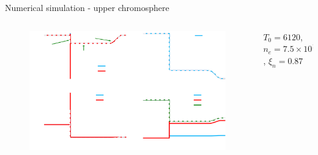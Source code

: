 \documentclass[10pt,aspectratio=169,usenames,dvipsnames]{beamer}
\begin{document}
\begin{frame}{Numerical simulation - upper chromosphere}
\begin{columns}
\begin{column}{0.8\textwidth}
\begin{figure}
    \includegraphics[width=0.95\linewidth]{2023StAndrewsAstro/Figures/context_upc_corrected.png}
    \label{fig:upperchromocontext}
\end{figure}
\end{column}
\begin{column}{0.2\textwidth}
    $T_0=6120$, $n_e=7.5\times 10^{16}$, $\xi_n=0.87$
\end{column}
\end{columns}
\end{frame}
\end{document}
